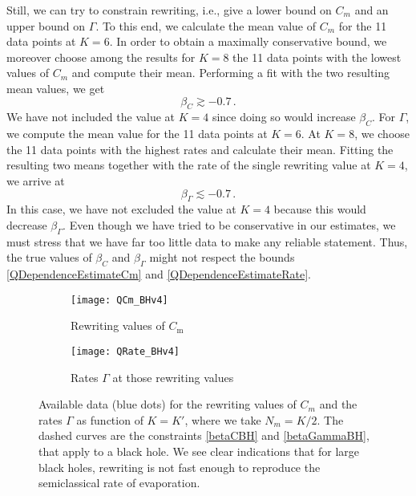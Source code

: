 \documentclass[aps,prd,reprint,superscriptaddress,nofootinbib]{revtex4-2}
\newcommand*{\ie}{i.e., }
\begin{document}
 Still, we can try to constrain rewriting, \ie give a lower bound on $C_m$ and an upper bound on $\Gamma$. 
		To this end, we calculate the mean value of $C_m$ for the 11 data points at $K=6$. In order to obtain a maximally conservative bound, we moreover choose among the results for $K=8$ the 11 data points with the lowest values of $C_m$ and compute their mean. Performing a fit with the two resulting mean values, we get
		\begin{equation} \label{QDependenceEstimateCm}
		\beta_C \gtrsim -0.7 \,.
		\end{equation}
		We have not included the value at $K=4$ since doing so would increase 
$	\beta_C$.
		 For $\Gamma$, we compute the mean value for the 11 data points at $K=6$. At $K=8$, we choose the 11 data points with the highest rates and calculate their mean. Fitting the resulting two means together with the rate of the single rewriting value at $K=4$, we arrive at
		 \begin{equation} \label{QDependenceEstimateRate}
		\beta_\Gamma \lesssim -0.7\,.
		 \end{equation}
		 In this case, we have not excluded the value at $K=4$ because this would decrease $\beta_\Gamma$.
Even though we have tried to be conservative in our estimates, we must stress that we have far too little data to make any reliable statement. Thus, the true values of $\beta_C$ and $\beta_\Gamma$ might not respect the bounds \eqref{QDependenceEstimateCm} and \eqref{QDependenceEstimateRate}.

\begin{figure*}
	\begin{subfigure}{0.45\textwidth}
		\texttt{[image: QCm\_BHv4]}
		\caption{Rewriting values of $C_{\text{m}}$
		} 
		\label{sfig:QDependenceCm}
	\end{subfigure}
	\hspace{0.05\textwidth}
	\begin{subfigure}{0.45\textwidth}
		\texttt{[image: QRate\_BHv4]}
		\caption{Rates $\Gamma$ at those rewriting values}
		\label{sfig:QDependenceRate}
	\end{subfigure}
	\caption{Available data (blue dots) for the rewriting values of $C_m$ and the rates $\Gamma$ as function of $K=K'$, where we take $N_m = K/2$.
 The dashed curves are the constraints \eqref{betaCBH} and \eqref{betaGammaBH}, that apply to a black hole. We see clear indications that for large black holes, rewriting is not fast enough to reproduce the semiclassical rate of evaporation.}
	\label{fig:QDependence}
\end{figure*}
\end{document}
